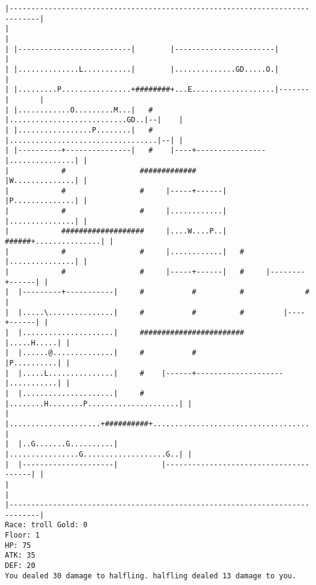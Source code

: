 \documentclass[11pt]{article}
\theoremstyle{plain}
\begin{document}
\begin{Verbatim}[fontsize=\scriptsize]
|-----------------------------------------------------------------------------|
|                                                                             |
| |--------------------------|        |-----------------------|               |
| |..............L...........|        |..............GD.....O.|               |
| |.........P................+########+...E...................|-------|       |
| |............O.........M...|   #    |...........................GD..|--|    |
| |.................P........|   #    |..................................|--| |
| |----------+---------------|   #    |----+----------------|...............| |
|            #                 #############                |W..............| |
|            #                 #     |-----+------|         |P..............| |
|            #                 #     |............|         |...............| |
|            ###################     |....W....P..|   ######+...............| |
|            #                 #     |............|   #     |...............| |
|            #                 #     |-----+------|   #     |--------+------| |
|  |---------+-----------|     #           #          #              #        |
|  |.....\...............|     #           #          #         |----+------| |
|  |.....................|     ########################         |.....H.....| |
|  |......@..............|     #           #                    |P..........| |
|  |.....L...............|     #    |------+--------------------|...........| |
|  |.....................|     #    |........H........P.....................| |
|  |.....................+##########+.......................................| |
|  |..G.......G..........|          |................G...................G..| |
|  |---------------------|          |---------------------------------------| |
|                                                                             |
|-----------------------------------------------------------------------------|
Race: troll Gold: 0                                                    Floor: 1
HP: 75
ATK: 35
DEF: 20
You dealed 30 damage to halfling. halfling dealed 13 damage to you.
\end{Verbatim}
\end{document}
